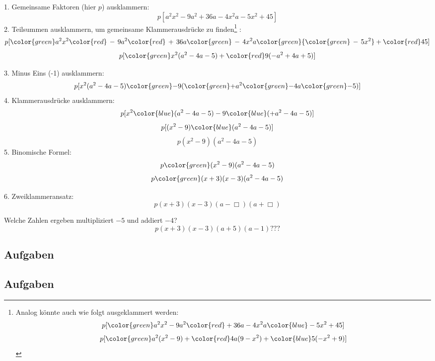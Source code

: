 1. Gemeinsame Faktoren (hier $p$) ausklammern:
$$p[a^2x^2 - 9a^2 + 36a -4x^2a -5x^2 + 45]$$
2. Teilsummen ausklammern, um gemeinsame Klammerausdrücke zu finden\footnote{
Analog könnte auch wie folgt ausgeklammert werden:
$$p[{\color{green}a^2x^2 -9a^2} {\color{red}+ 36a -4x^2a} {\color{blue}- 5x^2 + 45}]$$
$$p[{\color{green}a^2}(x^2 - 9) + {\color{red}4a}(9 - x^2) + {\color{blue}5}(-x^2 + 9)]$$
}
:
$$p[{\color{green}a^2x^2 } {\color{red}\, -\, 9a^2} {\color{red}\, +\, 36a} {\color{green}\, -\, 4x^2a} {\color{green} {\color{green}\,-\,5x^2} } + {\color{red}45}]$$
$$p[{\color{green}x^2} (a^2 -4a -5) + {\color{red}9}(-a^2 + 4a +5)]$$

3. Minus Eins (-1) ausklammern:
$$p[x^2 (a^2 -4a -5) {\color{green}-} 9({\color{green}+}a^2 {\color{green}-} 4a {\color{green}-} 5)]$$
4. Klammerausdrücke ausklammern:
$$p[x^2 {\color{blue}(a^2 -4a -5)} - 9{\color{blue}(+a^2 - 4a - 5)}]$$
$$p[(x^2-9) {\color{blue}(a^2 -4a -5)}]$$
$$p(x^2-9) (a^2 -4a -5)$$
5. Binomische Formel:
$$p{\color{green}(x^2-9)}(a^2 -4a -5)$$
$$p{\color{green}(x+3)(x-3)}(a^2 -4a -5)$$

6. Zweiklammeransatz:
$$p(x+3)(x-3) (a-\Box{})(a+\Box{})$$

Welche Zahlen ergeben multipliziert $-5$ und addiert $-4$?
$$p(x+3)(x-3)(a+5)(a-1) ???$$
\begin{center}{}\end{center}


\subsection*{Aufgaben}

\subsection*{Aufgaben}


\platzFuerBerechnungenBisEndeSeite{}
\newpage
